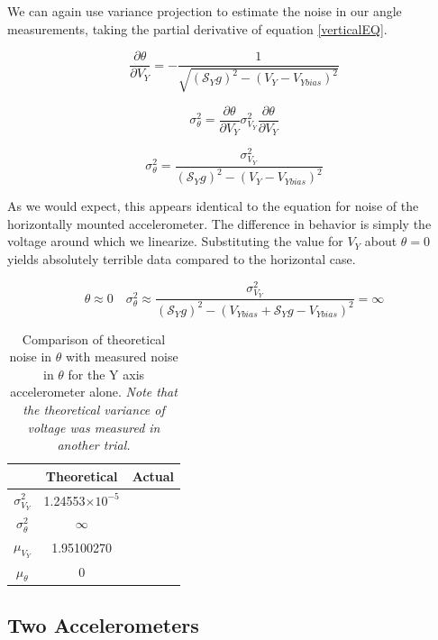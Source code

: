 \documentclass{article}
\theoremstyle{plain}
\theoremstyle{definition}
\theoremstyle{remark}
\newcommand{\Sens}{\mathcal{S}}
\providecommand{\e}[1]{\ensuremath{\times 10^{#1}}}
\begin{document}
We can again use variance projection to estimate the noise in our angle measurements, taking the partial derivative of equation \ref{verticalEQ}.

$$ \frac{\partial \theta}{\partial V_{Y}} = -\frac{1}{\sqrt{(\Sens_{Y} g)^2 - (V_{Y} - V_{Ybias})^2}}$$

$$ \sigma^2_{\theta} = \frac{\partial \theta}{\partial V_{Y}} \sigma^2_{V_{Y}} \frac{\partial \theta}{\partial V_{Y}} $$

$$ \sigma^2_{\theta} = \frac{\sigma^2_{V_{Y}}}{(\Sens_{Y} g)^2 - (V_{Y} - V_{Ybias})^2}$$

As we would expect, this appears identical to the equation for noise of the horizontally mounted accelerometer.  The difference in behavior is simply the voltage around which we linearize.  Substituting the value for $V_{Y}$ about $\theta = 0$  yields absolutely terrible data compared to the horizontal case.


$$ \theta \approx 0 \quad \sigma^2_{\theta} \approx \frac{\sigma^2_{V_{Y}}}{(\Sens_{Y} g)^2 - (V_{Ybias} + \Sens_{Y} g - V_{Ybias})^2} = \infty$$


\begin{table}
\begin{center}
    \begin{tabular}{|c|c|c|}
        \hline
        ~                   & Theoretical  & Actual \\ \hline
        $\sigma^2_{V_{Y}}$    & 1.24553\e{-5}  & ~      \\ 
	$\sigma^2_{\theta}$ & $\infty$           & ~      \\ 
	$\mu_{V_{Y}}$       & 1.95100270            & ~      \\
        $\mu_{\theta}$      & 0            & ~      \\
        \hline
    \end{tabular}
\label{Noise_vertical_T}
\caption{Comparison of theoretical noise in $\theta$ with measured noise in $\theta$ for the Y axis accelerometer alone. \emph{Note that the theoretical variance of voltage was measured in another trial.}}
\end{center}
\end{table}


\subsection{Two Accelerometers}
\end{document}
